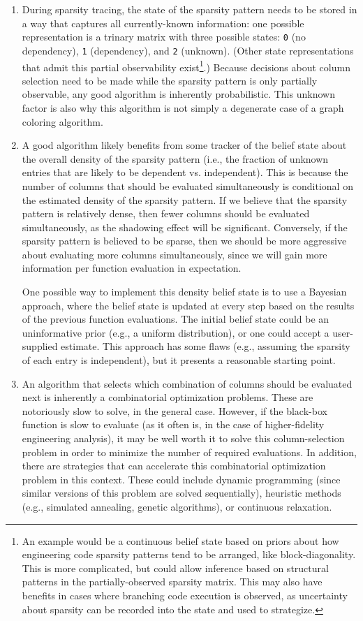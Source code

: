 \begin{enumerate}
    \item During sparsity tracing, the state of the sparsity pattern needs to be stored in a way that captures all currently-known information: one possible representation is a trinary matrix with three possible states: \texttt{0} (no dependency), \texttt{1} (dependency), and \texttt{2} (unknown). (Other state representations that admit this partial observability exist\footnote{An example would be a continuous belief state based on priors about how engineering code sparsity patterns tend to be arranged, like block-diagonality. This is more complicated, but could allow inference based on structural patterns in the partially-observed sparsity matrix. This may also have benefits in cases where branching code execution is observed, as uncertainty about sparsity can be recorded into the state and used to strategize.}.) Because decisions about column selection need to be made while the sparsity pattern is only partially observable, any good algorithm is inherently probabilistic. This unknown factor is also why this algorithm is not simply a degenerate case of a graph coloring algorithm.
    \item A good algorithm likely benefits from some tracker of the belief state about the overall density of the sparsity pattern (i.e., the fraction of unknown entries that are likely to be dependent vs. independent). This is because the number of columns that should be evaluated simultaneously is conditional on the estimated density of the sparsity pattern. If we believe that the sparsity pattern is relatively dense, then fewer columns should be evaluated simultaneously, as the shadowing effect will be significant. Conversely, if the sparsity pattern is believed to be sparse, then we should be more aggressive about evaluating more columns simultaneously, since we will gain more information per function evaluation in expectation.

    One possible way to implement this density belief state is to use a Bayesian approach, where the belief state is updated at every step based on the results of the previous function evaluations. The initial belief state could be an uninformative prior (e.g., a uniform distribution), or one could accept a user-supplied estimate. This approach has some flaws (e.g., assuming the sparsity of each entry is independent), but it presents a reasonable starting point.

    \item An algorithm that selects which combination of columns should be evaluated next is inherently a combinatorial optimization problems. These are notoriously slow to solve, in the general case. However, if the black-box function is slow to evaluate (as it often is, in the case of higher-fidelity engineering analysis), it may be well worth it to solve this column-selection problem in order to minimize the number of required evaluations. In addition, there are strategies that can accelerate this combinatorial optimization problem in this context. These could include dynamic programming (since similar versions of this problem are solved sequentially), heuristic methods (e.g., simulated annealing, genetic algorithms), or continuous relaxation.


\end{enumerate}
